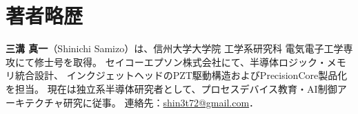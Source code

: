 \documentclass[conference]{IEEEtran}
\begin{document}
\section*{著者略歴}

\textbf{三溝 真一}（Shinichi Samizo）は、信州大学大学院 工学系研究科 電気電子工学専攻にて修士号を取得。  
セイコーエプソン株式会社にて、半導体ロジック・メモリ統合設計、  
インクジェットヘッドのPZT駆動構造およびPrecisionCore製品化を担当。  
現在は独立系半導体研究者として、プロセスデバイス教育・AI制御アーキテクチャ研究に従事。  
連絡先：\href{mailto:shin3t72@gmail.com}{shin3t72@gmail.com}．

\balance %
\end{document}
